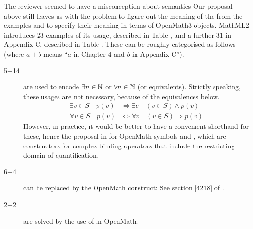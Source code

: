 \documentclass{llncs}
\begin{document}
\begin{newpart}{The reviewer seemed to have a misconception about semantics}
Our proposal above still leaves us with the problem to figure out the meaning of the
{} from the examples and to specify their meaning in terms of OpenMath3
objects.  MathML2 introduces 23 examples of its usage, described in Table ,
and a further 31 in Appendix C, described in Table . These can be roughly
categorised as follows (where $a+b$ means ``$a$ in Chapter 4 and $b$ in Appendix C'').
\begin{description}
\item[5+14]are used to encode $\exists n\in \mathbb{N}$ or $\forall n\in \mathbb{N}$ (or
equivalents). Strictly speaking, these usages are not necessary, because of
the equivalences below.
\begin{eqnarray}
\exists v\in S\quad p(v)&\Leftrightarrow \exists v\quad (v\in S)\land p(v)\\
\forall v\in S\quad p(v)&\Leftrightarrow \forall v\quad (v\in S)\Rightarrow p(v)
\end{eqnarray}
However, in practice, it would be better to have a convenient shorthand for these, hence
the proposal in \cite{DavenportKohlhase2009c} for OpenMath symbols
{} and {}, which are constructors for
complex binding operators that include the restricting domain of quantification.
\item[6+4]can be replaced by the OpenMath {} construct: See section
  \ref{4218}\iffull\else{} of \cite{DavenportKohlhase2009b}\fi.
\item[2+2]are solved by the use of {} in OpenMath.
\end{description}


\end{newpart}
\end{document}
